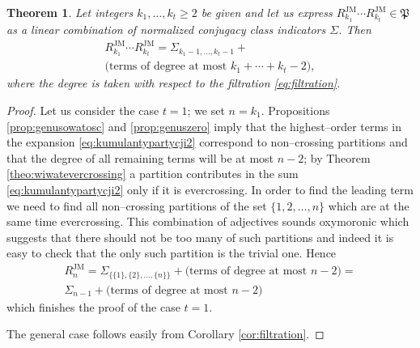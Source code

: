 \documentclass[12pt,dvips]{amsart}
\numberwithin{equation}{section} \numberwithin{figure}{section}
\theoremstyle{plain}
\newtheorem{theorem}[lemma]{Theorem}
\theoremstyle{definition}
\theoremstyle{remark}
\newcommand{\RJM}{R^{\JM}}
\newcommand{\myalgebra}{\mathfrak{P}}
\DeclareMathOperator{\JM}{JM}
\begin{document}
\begin{theorem}
\label{theo:pierwszystopien}
Let integers $k_1,\dots,k_t\geq 2$ be given and let us express
$\RJM_{k_1} \cdots \RJM_{k_t}\in\myalgebra$ as a linear combination
of normalized conjugacy class indicators $\Sigma$. Then
\begin{multline}
\label{eq:highestorde} \RJM_{k_1} \cdots
\RJM_{k_t}=\Sigma_{k_1-1,\dots,k_t-1}+\\ \text{(terms of degree at
most } k_1+\cdots+k_t-2\text{)},
\end{multline}
where the degree is taken with respect to the filtration
\eqref{eq:filtration}.
\end{theorem}
\begin{proof}
Let us consider the case $t=1$; we set $n=k_1$. Propositions
\ref{prop:genusowatosc} and \ref{prop:genuszero} imply that the
highest--order terms in the expansion \eqref{eq:kumulantypartycji2}
correspond to non--crossing partitions and that the degree of all
remaining terms will be at most $n-2$; by Theorem
\ref{theo:wiwatevercrossing} a partition contributes in the sum
\eqref{eq:kumulantypartycji2} only if it is evercrossing. In order
to find the leading term we need to find all non--crossing
partitions of the set $\{1,2,\dots,n\}$ which are at the same time
evercrossing. This combination of adjectives sounds oxymoronic which
suggests that there should not be too many of such partitions and
indeed it is easy to check that the only such partition is the
trivial one. Hence
\begin{multline*}
\RJM_n=\Sigma_{ \{ \{1\},\{2\},\dots,\{n\} \} }+\text{(terms of
degree at most } n-2\text{)} =
\\ \Sigma_{n-1} + \text{(terms of degree at most } n-2\text{)}
\end{multline*}
which finishes the proof of the case $t=1$.

The general case follows easily from Corollary \ref{cor:filtration}.
\end{proof}
\end{document}
